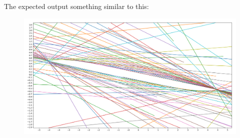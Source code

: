 \documentclass[12pt]{article}%
\begin{document}
The expected output something similar to this:
\begin{figure}[H]
    \begin{center}
    \includegraphics[width=16cm]{mpi_set.png}
    \caption{}
    \end{center}
\end{figure}



\printbibliography
\end{document}
